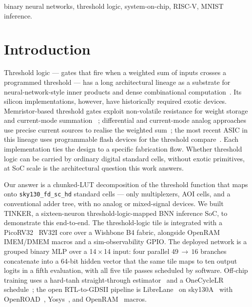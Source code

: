 \documentclass[conference]{IEEEtran}
\begin{document}
\begin{IEEEkeywords}
  binary neural networks, threshold logic, system-on-chip, RISC-V, MNIST inference.
\end{IEEEkeywords}

\section{Introduction}
\label{sec:intro}

Threshold logic --- gates that fire when a weighted sum of inputs
crosses a programmed threshold --- has a long architectural lineage
as a substrate for neural-network-style inner products and dense
combinational computation~\cite{beiu2003vlsi}. Its silicon
implementations, however, have historically required exotic
devices. Memristor-based threshold gates exploit non-volatile
resistance for weight storage and current-mode summation
~\cite{papandroulidakis2019practical}; differential and
current-mode analog approaches use precise current sources to
realise the weighted sum~\cite{beiu2003differential}; the most
recent ASIC in this lineage uses programmable flash devices for
the threshold compare~\cite{tulip}. Each implementation ties the
design to a specific fabrication flow. Whether threshold logic
can be carried by ordinary digital standard cells, without exotic
primitives, at SoC scale is the architectural question this work
answers.

Our answer is a chunked-LUT decomposition of the threshold
function that maps onto \texttt{sky130\_fd\_sc\_hd} standard cells
--- only multiplexers, AOI cells, and a conventional adder tree,
with no analog or mixed-signal devices. We built TINKER, a
sixteen-neuron threshold-logic-mapped BNN inference SoC, to
demonstrate this end-to-end. The threshold-logic tile is
integrated with a PicoRV32~\cite{picorv32} RV32I core over a
Wishbone B4 fabric, alongside OpenRAM IMEM/DMEM macros and a
sim-observability GPIO. The deployed network is a grouped binary
MLP over a 14\,\(\times\)\,14 input: four parallel
49\,\(\to\,16\) branches concatenate into a 64-bit hidden vector
that the same tile maps to ten output logits in a fifth
evaluation, with all five tile passes scheduled by software.
Off-chip training uses a hard-tanh straight-through
estimator~\cite{hubara_bnn} and a OneCycleLR
schedule~\cite{onecycle}; the open RTL-to-GDSII pipeline is
LibreLane~\cite{librelane} on sky130A~\cite{sky130_pdk} with
OpenROAD~\cite{openroad}, Yosys~\cite{yosys}, and
OpenRAM~\cite{openram} macros.
\end{document}
